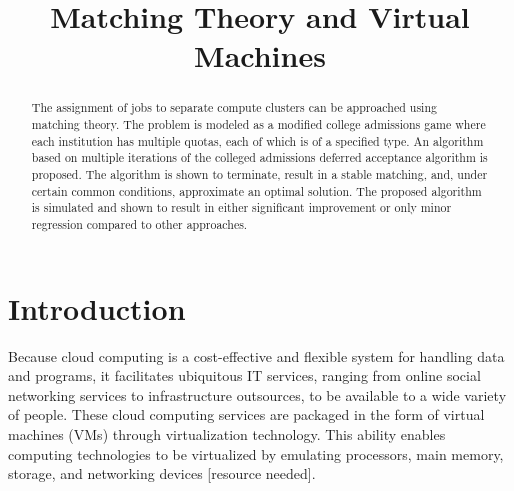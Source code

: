 \documentclass[conference]{IEEEtran}
\begin{document}
%
\title{Matching Theory and Virtual Machines}


\author{
\and
{}
}


\maketitle


\begin{abstract}
The assignment of jobs to separate compute clusters 
can be approached using matching theory. 
The problem is modeled as a modified college admissions
game where each institution has multiple quotas,
each of which is of a specified type.
An algorithm based on multiple iterations of the 
colleged admissions deferred acceptance algorithm is 
proposed.
The algorithm is shown to terminate, result in 
a stable matching, and, under certain common conditions,
approximate an optimal solution.
The proposed algorithm is simulated 
and shown to result in either significant improvement 
or only minor regression compared to other approaches.
\end{abstract}


\section{Introduction}
\label{sec:intro}
Because cloud computing is a cost-effective
and flexible system for handling data and programs,
it facilitates ubiquitous IT services,
ranging from online social networking services to infrastructure
outsources, to be available to a wide variety of people.  
These cloud computing services are packaged in the form of
virtual machines (VMs) through virtualization technology.
This ability enables computing technologies
to be virtualized by emulating processors, main memory, storage,
and networking devices [resource needed].  
\end{document}
